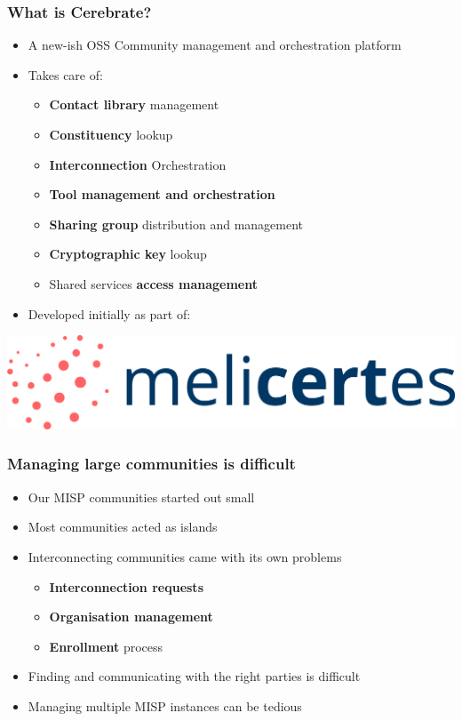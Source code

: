
\begin{frame}[t,plain]
\titlepage
\end{frame}

\begin{frame}
\frametitle{What is Cerebrate?}
    \begin{itemize}
        \item A new-ish OSS Community management and orchestration platform
        \item Takes care of:
        \begin{itemize}
            \item {\bf Contact library} management
            \item {\bf Constituency} lookup
            \item {\bf Interconnection} Orchestration
            \item {\bf Tool management and orchestration}
            \item {\bf Sharing group} distribution and management
            \item {\bf Cryptographic key} lookup
            \item Shared services {\bf access management}
        \end{itemize}
        \item Developed initially as part of:
    \end{itemize}
    \vspace{0.5em}
    \begin{center}
        \includegraphics[width=0.55\linewidth]{pictures/melicertes.png}
    \end{center}
\end{frame}

\begin{frame}
\frametitle{Managing large communities is difficult}
    \begin{itemize}
        \item Our MISP communities started out small
        \item Most communities acted as islands
        \item Interconnecting communities came with its own problems
        \begin{itemize}
            \item {\bf Interconnection requests}
            \item {\bf Organisation management}
            \item {\bf Enrollment} process
        \end{itemize}
        \item Finding and communicating with the right parties is difficult
        \item Managing multiple MISP instances can be tedious
    \end{itemize}
\end{frame}

